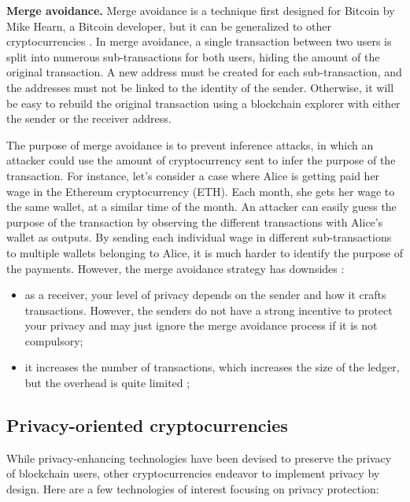 \textbf{Merge avoidance.}
Merge avoidance is a technique first designed for Bitcoin \cite{Hearn2013, Simoes2021} by Mike Hearn, a Bitcoin developer, but it can be generalized to other cryptocurrencies \cite{Sarfraz2019}. In merge avoidance, a single transaction between two users is split into numerous sub-transactions for both users, hiding the amount of the original transaction. A new address must be created for each sub-transaction, and the addresses must not be linked to the identity of the sender. Otherwise, it will be easy to rebuild the original transaction using a blockchain explorer with either the sender or the receiver address.

The purpose of merge avoidance is to prevent inference attacks, in which an attacker could use the amount of cryptocurrency sent to infer the purpose of the transaction. For instance, let's consider a case where Alice is getting paid her wage in the Ethereum cryptocurrency (ETH). Each month, she gets her wage to the same wallet, at a similar time of the month. An attacker can easily guess the purpose of the transaction by observing the different transactions with Alice's wallet as outputs. By sending each individual wage in different sub-transactions to multiple wallets belonging to Alice, it is much harder to identify the purpose of the payments.
However, the merge avoidance strategy has downsides \cite{Hearn2013}:

\begin{itemize}
    \item as a receiver, your level of privacy depends on the sender and how it crafts transactions. However, the senders do not have a strong incentive to protect your privacy and may just ignore the merge avoidance process if it is not compulsory;  
    \item it increases the number of transactions, which increases the size of the ledger, but the overhead is quite limited \cite{Hearn2013};
\end{itemize}

\subsection{Privacy-oriented cryptocurrencies}

While privacy-enhancing technologies have been devised to preserve the privacy of blockchain users, other cryptocurrencies endeavor to implement privacy by design. Here are a few technologies of interest focusing on privacy protection:

